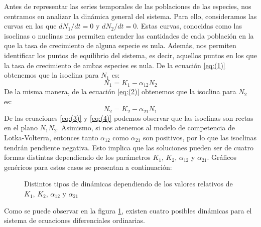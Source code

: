 \documentclass{article}
\begin{document}
\hspace{1cm} Antes de representar las series temporales de las poblaciones de las especies, nos centramos en analizar la dinámica general del sistema. Para ello, consideramos las curvas en las que
\(dN_1/dt = 0\) y \(dN_2/dt = 0\). Estas curvas, conocidas como las isoclinas o nuclinas nos permiten entender las cantidades de cada población en la que la tasa de crecimiento de alguna especie
es nula. Además, nos permiten identificar los puntos de equilibrio del sistema, es decir, aquellos puntos en los que la tasa de crecimiento de ambas especies es nula. De la ecuación \ref{eq:(1)}
obtenemos que la isoclina para \(N_1\) es:
\begin{equation}
N_1 = K_1 - \alpha_{12}N_2 \label{eq:(3)}
\end{equation}
\hspace{1cm} De la misma manera, de la ecuación \ref{eq:(2)} obtenemos que la isoclina para \(N_2\) es:
\begin{equation}
N_2 = K_2 - \alpha_{21}N_1  \label{eq:(4)}
\end{equation}
\hspace{1cm} De las ecuaciones \ref{eq:(3)} y \ref{eq:(4)} podemos observar que las isoclinas son rectas en el plano \(N_1N_2\). Asimismo, si nos atenemos al modelo de competencia de Lotka-Volterra,
entonces tanto \(\alpha_{12}\) como \(\alpha_{21}\) son positivos, por lo que las isoclinas tendrán pendiente negativa. Esto implica que las soluciones pueden ser de cuatro formas distintas
dependiendo de los parámetros \(K_1\), \(K_2\), \(\alpha_{12}\) y \(\alpha_{21}\). Gráficos genéricos para estos casos se presentan a continuación:
\begin{figure}
    \centering
    \caption{Distintos tipos de dinámicas dependiendo de los valores relativos de \(K_1\), \(K_2\), \(\alpha_12\) y \(\alpha_21\)}
    \label{fig:imagen-larga}
\end{figure}
\hspace{1cm}Como se puede observar en la figura \ref{fig:imagen-larga}, existen cuatro posibles dinámicas para el sistema de ecuaciones diferenciales ordinarias.
\end{document}
